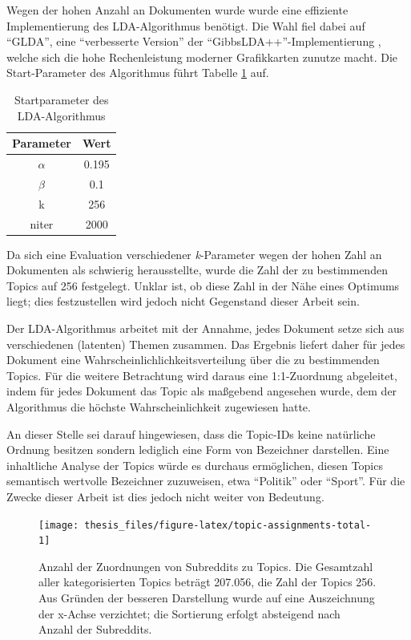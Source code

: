 \documentclass[11pt,a4paper,twoside]{article}
\begin{document}
Wegen der hohen Anzahl an Dokumenten wurde wurde eine effiziente
Implementierung des LDA-Algorithmus benötigt. Die Wahl fiel dabei auf
\enquote{GLDA}, eine \enquote{verbesserte Version} \autocite{Lu2013} der
\enquote{GibbsLDA++}-Implementierung \autocite{Phan2007}, welche sich
die hohe Rechenleistung moderner Grafikkarten zunutze macht. Die
Start-Parameter des Algorithmus führt Tabelle \ref{tab:lda-params} auf.

\begin{table}

\caption{\label{tab:lda-params}Startparameter des LDA-Algorithmus}
\centering
\begin{tabular}[t]{cc}
\toprule
Parameter & Wert\\
\midrule
$\alpha$ & 0.195\\
$\beta$ & 0.1\\
k & 256\\
niter & 2000\\
\bottomrule
\end{tabular}
\end{table}

Da sich eine Evaluation verschiedener \emph{k}-Parameter wegen der hohen
Zahl an Dokumenten als schwierig herausstellte, wurde die Zahl der zu
bestimmenden Topics auf 256 festgelegt. Unklar ist, ob diese Zahl in der
Nähe eines Optimums liegt; dies festzustellen wird jedoch nicht
Gegenstand dieser Arbeit sein.

Der LDA-Algorithmus arbeitet mit der Annahme, jedes Dokument setze sich
aus verschiedenen (latenten) Themen zusammen. Das Ergebnis liefert daher
für jedes Dokument eine Wahrscheinlichlichkeitsverteilung über die zu
bestimmenden Topics. Für die weitere Betrachtung wird daraus eine
1:1-Zuordnung abgeleitet, indem für jedes Dokument das Topic als
maßgebend angesehen wurde, dem der Algorithmus die höchste
Wahrscheinlichkeit zugewiesen hatte.

An dieser Stelle sei darauf hingewiesen, dass die Topic-IDs keine
natürliche Ordnung besitzen sondern lediglich eine Form von Bezeichner
darstellen. Eine inhaltliche Analyse der Topics würde es durchaus
ermöglichen, diesen Topics semantisch wertvolle Bezeichner zuzuweisen,
etwa \enquote{Politik} oder \enquote{Sport}. Für die Zwecke dieser
Arbeit ist dies jedoch nicht weiter von Bedeutung.







\begin{figure}

{\centering \texttt{[image: thesis\_files/figure-latex/topic-assignments-total-1]} 

}

\caption{Anzahl der Zuordnungen von Subreddits
zu Topics. Die Gesamtzahl aller kategorisierten Topics beträgt 207.056,
die Zahl der Topics 256. Aus Gründen der besseren Darstellung wurde auf
eine Auszeichnung der x-Achse verzichtet; die Sortierung erfolgt
absteigend nach Anzahl der Subreddits.}\label{fig:topic-assignments-total}
\end{figure}
\end{document}
